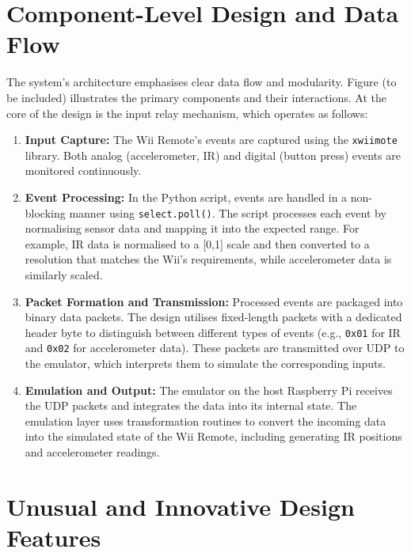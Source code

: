 \section{Component-Level Design and Data Flow}

The system’s architecture emphasises clear data flow and modularity. Figure%
(to be included) illustrates the primary components and their interactions. At the core of the design is the input relay mechanism, which operates as follows:

\begin{enumerate}
    \item \textbf{Input Capture:}
          The Wii Remote’s events are captured using the \texttt{xwiimote} library. Both analog (accelerometer, IR) and digital (button press) events are monitored continuously.

    \item \textbf{Event Processing:}
          In the Python script, events are handled in a non-blocking manner using \texttt{select.poll()}. The script processes each event by normalising sensor data and mapping it into the expected range. For example, IR data is normalised to a [0,1] scale and then converted to a resolution that matches the Wii’s requirements, while accelerometer data is similarly scaled.

    \item \textbf{Packet Formation and Transmission:}
          Processed events are packaged into binary data packets. The design utilises fixed-length packets with a dedicated header byte to distinguish between different types of events (e.g., \texttt{0x01} for IR and \texttt{0x02} for accelerometer data). These packets are transmitted over UDP to the emulator, which interprets them to simulate the corresponding inputs.

    \item \textbf{Emulation and Output:}
          The emulator on the host Raspberry Pi receives the UDP packets and integrates the data into its internal state. The emulation layer uses transformation routines to convert the incoming data into the simulated state of the Wii Remote, including generating IR positions and accelerometer readings.
\end{enumerate}

\section{Unusual and Innovative Design Features}


